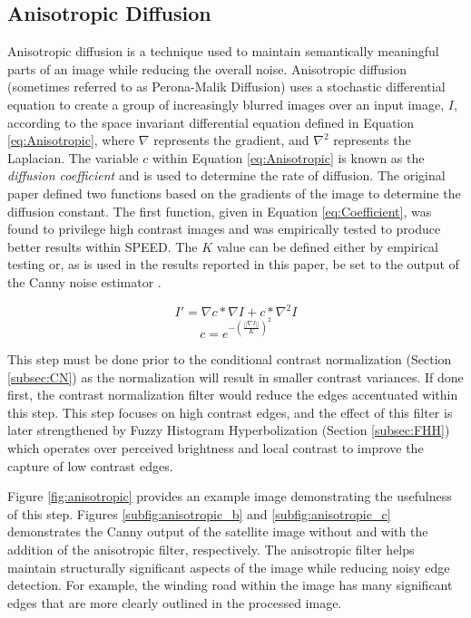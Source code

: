 \documentclass[conference]{IEEEtran}
\begin{document}
\subsection{Anisotropic Diffusion}
\label{subsec:AD}

Anisotropic diffusion is a technique used to maintain semantically meaningful parts of an image while reducing the overall noise. Anisotropic diffusion (sometimes referred to as Perona-Malik Diffusion) uses a stochastic differential equation to create a group of increasingly blurred images over an input image, $I$, according to the space invariant differential equation defined in Equation \ref{eq:Anisotropic}, where $\nabla$ represents the gradient, and $\nabla^2$ represents the Laplacian. The variable $c$ within Equation \ref{eq:Anisotropic} is known as the \emph{diffusion coefficient} and is used to determine the rate of diffusion. The original paper defined two functions based on the gradients of the image to determine the diffusion constant. The first function, given in Equation \ref{eq:Coefficient}, was found to privilege high contrast images and was empirically tested to produce better results within SPEED. The $K$ value can be defined either by empirical testing or, as is used in the results reported in this paper, be set to the output of the Canny noise estimator \cite{Canny1986}. 

\begin{equation}
    \label{eq:Anisotropic}
    I' =\nabla c * \nabla I + c * \nabla^2 I
\end{equation}
\begin{equation}
    \label{eq:Coefficient}
    c = e^{-\left( \frac{||\nabla I ||}{K} \right)^2}
\end{equation}

This step must be done prior to the conditional contrast normalization (Section \ref{subsec:CN}) as the normalization will result in smaller contrast variances. If done first, the contrast normalization filter would reduce the edges accentuated within this step. This step focuses on high contrast edges, and the effect of this filter is later strengthened by Fuzzy Histogram Hyperbolization (Section \ref{subsec:FHH}) which operates over perceived brightness and local contrast to improve the capture of low contrast edges.

Figure \ref{fig:anisotropic} provides an example image demonstrating the usefulness of this step. Figures \ref{subfig:anisotropic_b} and \ref{subfig:anisotropic_c} demonstrates the Canny output of the satellite image without and with the addition of the anisotropic filter, respectively. The anisotropic filter helps maintain structurally significant aspects of the image while reducing noisy edge detection. For example, the winding road within the image has many significant edges that are more clearly outlined in the processed image.
\end{document}
